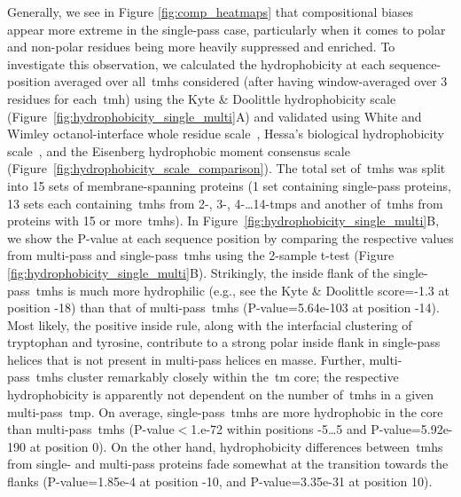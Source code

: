Generally, we see in Figure \ref{fig:comp_heatmaps} that compositional biases appear more extreme in the single-pass case, particularly when it comes to polar and non-polar residues being more heavily suppressed and enriched.
To investigate this observation, we calculated the hydrophobicity at each sequence-position averaged over all~\gls{tmh}s considered (after having window-averaged over 3 residues for each~\gls{tmh}) using the Kyte \& Doolittle hydrophobicity scale~\cite{Kyte1982} (Figure~\ref{fig:hydrophobicity_single_multi}A) and validated using White and Wimley octanol-interface whole residue scale~\cite{White1999}, Hessa’s biological hydrophobicity scale~\cite{Hessa2005}, and the Eisenberg hydrophobic moment consensus scale~\cite{Eisenberg1984} (Figure~\ref{fig:hydrophobicity_scale_comparison}).
The total set of~\gls{tmh}s was split into 15 sets of membrane-spanning proteins (1 set containing single-pass proteins, 13 sets each containing~\gls{tmh}s from 2-, 3-, 4-\ldots 14-\gls{tmp}s and another of~\gls{tmh}s from proteins with 15 or more~\gls{tmh}s).
In Figure~\ref{fig:hydrophobicity_single_multi}B, we show the P\--value at each sequence position by comparing the respective values from multi-pass and single-pass~\gls{tmh}s using the 2-sample t-test (Figure \ref{fig:hydrophobicity_single_multi}B).
Strikingly, the inside flank of the single-pass~\gls{tmh}s is much more hydrophilic (e.g., see the Kyte \& Doolittle score=-1.3 at position -18) than that of multi-pass~\gls{tmh}s (P\--value=5.64e-103 at position -14).
Most likely, the positive inside rule, along with the interfacial clustering of tryptophan and tyrosine, contribute to a strong polar inside flank in single-pass helices that is not present in multi-pass helices en masse.
Further, multi-pass~\gls{tmh}s cluster remarkably closely within the~\gls{tm} core; the respective hydrophobicity is apparently not dependent on the number of~\gls{tmh}s in a given multi-pass~\gls{tmp}.
On average, single-pass~\gls{tmh}s are more hydrophobic in the core than multi-pass~\gls{tmh}s (P\--value$<$1.e-72 within positions -5…5 and P\--value=5.92e-190 at position 0).
On the other hand, hydrophobicity differences between~\gls{tmh}s from single- and multi-pass proteins fade somewhat at the transition towards the flanks (P\--value=1.85e-4 at position -10, and P\--value=3.35e-31 at position 10).

